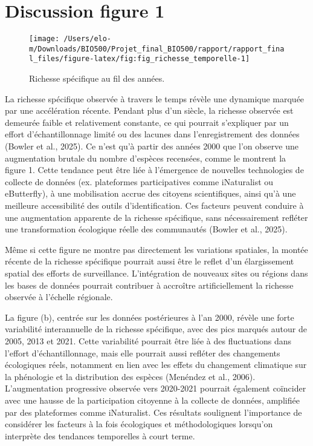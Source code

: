 \documentclass[9pt,twocolumn,twoside,]{pnas-new}
\begin{document}
\section*{Discussion figure 1}\label{discussion-figure-1}

\begin{figure}

{\centering \texttt{[image: /Users/elo-m/Downloads/BIO500/Projet\_final\_BIO500/rapport/rapport\_final\_files/figure-latex/fig:fig\_richesse\_temporelle-1]} 

}

\caption{\label{fig:fig_richesse_temporelle}Richesse spécifique au fil des années.}\label{fig:fig:fig_richesse_temporelle}
\end{figure}

La richesse spécifique observée à travers le temps révèle une dynamique
marquée par une accélération récente. Pendant plus d'un siècle, la
richesse observée est demeurée faible et relativement constante, ce qui
pourrait s'expliquer par un effort d'échantillonnage limité ou des
lacunes dans l'enregistrement des données (Bowler et al., 2025). Ce
n'est qu'à partir des années 2000 que l'on observe une augmentation
brutale du nombre d'espèces recensées, comme le montrent la figure 1.
Cette tendance peut être liée à l'émergence de nouvelles technologies de
collecte de données (ex. plateformes participatives comme iNaturalist ou
eButterfly), à une mobilisation accrue des citoyens scientifiques, ainsi
qu'à une meilleure accessibilité des outils d'identification. Ces
facteurs peuvent conduire à une augmentation apparente de la richesse
spécifique, sans nécessairement refléter une transformation écologique
réelle des communautés (Bowler et al., 2025).

Même si cette figure ne montre pas directement les variations spatiales,
la montée récente de la richesse spécifique pourrait aussi être le
reflet d'un élargissement spatial des efforts de surveillance.
L'intégration de nouveaux sites ou régions dans les bases de données
pourrait contribuer à accroître artificiellement la richesse observée à
l'échelle régionale.

La figure (b), centrée sur les données postérieures à l'an 2000, révèle
une forte variabilité interannuelle de la richesse spécifique, avec des
pics marqués autour de 2005, 2013 et 2021. Cette variabilité pourrait
être liée à des fluctuations dans l'effort d'échantillonnage, mais elle
pourrait aussi refléter des changements écologiques réels, notamment en
lien avec les effets du changement climatique sur la phénologie et la
distribution des espèces (Menéndez et al., 2006). L'augmentation
progressive observée vers 2020-2021 pourrait également coïncider avec
une hausse de la participation citoyenne à la collecte de données,
amplifiée par des plateformes comme iNaturalist. Ces résultats
soulignent l'importance de considérer les facteurs à la fois écologiques
et méthodologiques lorsqu'on interprète des tendances temporelles à
court terme.
\end{document}
